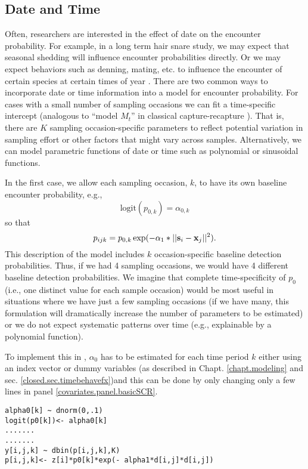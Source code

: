 \subsection{Date and Time}

Often, researchers are interested in the effect of date on the
encounter probability. For example, in a long term hair snare study,
we may expect that seasonal shedding \citep{wegan_etal:2012} will influence encounter
probabilities directly. Or we
may expect behaviors such as denning, mating, etc. to influence the encounter of
certain species at certain times of year \citep{kery_etal:2011}.  There are two common ways
to incorporate date or time information into a model for encounter
probability. For cases with a small number of sampling occasions we
can fit a time-specific intercept (analogous to ``model $M_{t}$'' in
classical capture-recapture \citep{otis_etal:1978}). That is, there
are $K$ sampling occasion-specific parameters to reflect potential
variation in sampling effort or other factors that might vary across
samples.  Alternatively, we can model parametric functions of date or
time such as polynomial or sinusoidal functions.

In the first case, we allow each sampling occasion, $k$, to have its
own baseline encounter probability, e.g.,
\[
\mbox{logit}(p_{0,k}) = \alpha_{0,k}
\]
so that
\[
p_{ijk} = p_{0,k} \exp(- \alpha_1*||{\bf s}_{i}-{\bf x}_{j}||^2).
\]
This description of the model includes $k$ occasion-specific baseline
detection probabilities.  Thus, if we had 4 sampling occasions, we
would have 4 different baseline detection probabilities.  We imagine
that complete time-specificity of $p_{0}$ 
(i.e., one distinct value for each sample occasion)
would be most useful in situations
where we have just a few sampling occasions (if we have many, this
formulation will dramatically increase the number of parameters to be
estimated) or we do not expect systematic patterns over time (e.g.,
explainable by a polynomial function).

To implement this in \jags, $\alpha_0$ has to be
estimated for each time period $k$ either using an index vector or
dummy variables (as described in Chapt. \ref{chapt.modeling} and sec. 
\ref{closed.sec.timebehavefx})and this can be done by only 
changing only a few lines in panel \ref{covariates.panel.basicSCR}.

\begin{verbatim}
alpha0[k] ~ dnorm(0,.1)
logit(p0[k])<- alpha0[k]
.......
.......
y[i,j,k] ~ dbin(p[i,j,k],K)
p[i,j,k]<- z[i]*p0[k]*exp(- alpha1*d[i,j]*d[i,j])
\end{verbatim}

